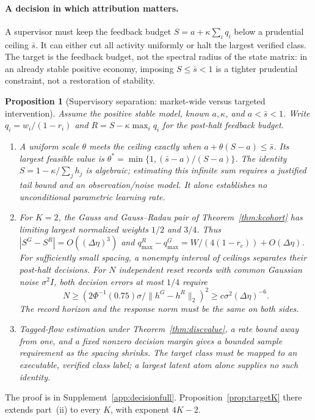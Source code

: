\documentclass[12pt]{article}
\newtheorem{proposition}[theorem]{Proposition}
\theoremstyle{definition}
\theoremstyle{remark}
\begin{document}
\paragraph{A decision in which attribution matters.} A supervisor must keep the feedback budget $S=a+\kappa\sum_iq_i$ below a prudential ceiling $\bar s$. It can either cut all activity uniformly or halt the largest verified class. The target is the feedback budget, not the spectral radius of the state matrix: in an already stable positive economy, imposing $S\le\bar s<1$ is a tighter prudential constraint, not a restoration of stability.


\begin{proposition}[Supervisory separation: market-wide versus targeted intervention]\label{prop:target}
Assume the positive stable model, known $a,\kappa$, and $a<\bar s<1$. Write $q_i=w_i/(1-r_i)$ and $R=S-\kappa\max_iq_i$ for the post-halt feedback budget.
\begin{enumerate}[label=(\roman*),itemsep=1pt]
\item A uniform scale $\theta$ meets the ceiling exactly when $a+\theta(S-a)\le\bar s$. Its largest feasible value is $\theta^*=\min\{1,(\bar s-a)/(S-a)\}$. The identity $S=1-\kappa/\sum_jh_j$ is algebraic; estimating this infinite sum requires a justified tail bound and an observation/noise model. It alone establishes no unconditional parametric learning rate.
\item For $K=2$, the Gauss and Gauss--Radau pair of Theorem~\ref{thm:kcohort} has limiting largest normalized weights $1/2$ and $3/4$. Thus $|S^G-S^R|=O((\Delta\eta)^3)$ and $q^R_{\max}-q^G_{\max}=W/(4(1-r_c))+O(\Delta\eta)$. For sufficiently small spacing, a nonempty interval of ceilings separates their post-halt decisions. For $N$ independent reset records with common Gaussian noise $\sigma^2 I$, both decision errors at most $1/4$ require
\[
 N\ge (2\Phi^{-1}(0.75)\sigma/\|h^G-h^R\|_2)^2
 \ge c\sigma^2(\Delta\eta)^{-6}.
\]
The record horizon and the response norm must be the same on both sides.
\item Tagged-flow estimation under Theorem~\ref{thm:discvalue}, a rate bound away from one, and a fixed nonzero decision margin gives a bounded sample requirement as the spacing shrinks. The target class must be mapped to an executable, verified class label; a largest latent atom alone supplies no such identity.
\end{enumerate}
\end{proposition}
The proof is in Supplement~\ref{app:decisionfull}. Proposition~\ref{prop:targetK} there extends part~(ii) to every $K$, with exponent $4K-2$.
\end{document}
